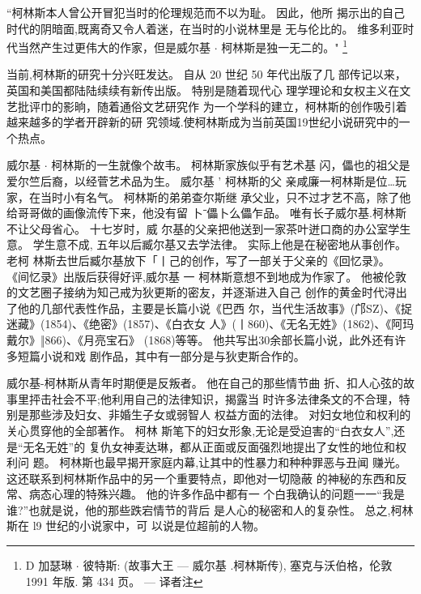 \documentclass[a4paper]{article}
\begin{document}
``柯林斯本人曾公开冒犯当时的伦理规范而不以为耻。 因此，他所
揭示出的自己时代的阴暗面,既离奇又令人着迷，在当时的小说林里是
无与伦比的。 维多利亚时代当然产生过更伟大的作家，但是威尔基 $\cdot$
柯林斯是独一无二的。" \footnote{D 加瑟琳 $\cdot$ 彼特斯: (故事大王 --- 威尔基 .柯林斯传), 塞克与沃伯格，伦敦 1991 年版. 第 434 页。 --- 译者注}

当前,柯林斯的研究十分兴旺发达。 自从 20 世纪 50 年代出版了几
部传记以来，英国和美国都陆陆续续有新传出版。 特别是随着现代心
理学理论和女权主义在文艺批评巾的影晌，随着通俗文艺研究作
为一个学科的建立，柯林斯的创作吸引着越来越多的学者开辟新的研
究领域.使柯林斯成为当前英国19世纪小说研究中的一个热点。

威尔基 $\cdot$ 柯林斯的一生就像个故韦。 柯林斯家族似乎有艺术基
闪，儡也的祖父是爱尔竺后裔，以经菅艺术品为生。 威尔基 ' 柯林斯的父
亲咸廉一柯林斯是位…玩家，在当时小有名气。 柯林斯的弟弟查尔斯继
承父业，只不过才艺不高，除了他给哥哥做的画像流传下来，他没有留
卜ˉ儡卜么儡乍品。 唯有长子威尔基.柯林斯不让父母省心。 十七岁时，威
尔基的父亲把他送到一家茶叶迸口商的办公室学生意。 学生意不成,
五年以后臧尔基又去学法律。 实际上他是在秘密地从事创作。 老柯
林斯去世后臧尔基放下「丨己的创作，写了一部关于父亲的《回忆录》。
《间忆录》出版后获得好评,威尔基 一 柯林斯意想不到地成为作家了。
他被伦敦的文艺圈子接纳为知己戒为狄更斯的密友，并逐渐进入自己
创作的黄金时代浔出了他的几部代表性作品，主要是长篇小说《巴西
尔，当代生活故事》(邝SZ)、《捉迷藏》(1854)、《绝密》(1857)、《白衣女
人》(丨860)、《无名无姓》(1862)、《阿玛戴尔》‖866)、《月亮宝石》
(1868)等等。 他共写出30余部长篇小说，此外还有许多短篇小说和戏
剧作品，其中有一部分是与狄吏斯合作的。

威尔基-柯林斯从青年时期便是反叛者。 他在自己的那些情节曲
折、扣人心弦的故事里抨击社会不平;他利用自己的法律知识，揭露当
时许多法律条文的不合理，特别是那些涉及妇女、非婚生子女或弱智人
权益方面的法律。 对妇女地位和权利的关心贯穿他的全部著作。 柯林
斯笔下的妇女形象,无论是受迫害的“白衣女人”,还是“无名无姓”的
复仇女神麦达琳，都从正面或反面强烈地提出了女性的地位和权利问
题。 柯林斯也最早揭开家庭内幕,让其中的性暴力和种种罪恶与丑闻
赚光。 这还联系到柯林斯作品中的另一个重要特点，即他对一切隐蔽
的神秘的东西和反常、病态心理的特殊兴趣。 他的许多作品中都有一
个白我确认的问题一一“我是谁?”也就是说，他的那些跌宕情节的背后
是人心的秘密和人的复杂性。 总之,柯林斯在 l9 世纪的小说家中，可
以说是位超前的人物。
\end{document}

